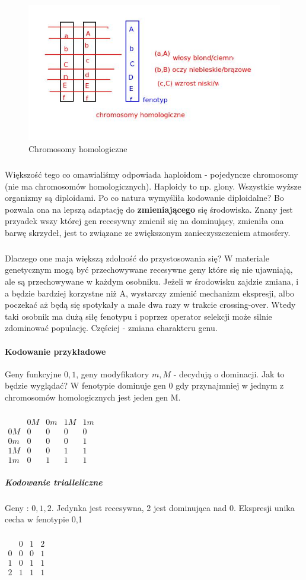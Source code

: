 \documentclass{article}
\begin{document}
		\begin{figure}[ht]
			\label{fig:fig2}
			\centering
			\includegraphics[scale=0.5]{homologiczne.jpeg}
			\caption{Chromosomy homologiczne}
		\end{figure}
		
		\subparagraph{} Większość tego co omawialiśmy odpowiada haploidom - pojedyncze chromosomy (nie ma chromosomów homologicznych). Haploidy to np. glony. Wszystkie wyższe organizmy są diploidami. Po co natura wymyśliła kodowanie diploidalne? Bo pozwala ona na lepszą adaptację do \textbf{zmieniającego} się środowiska. Znany jest przyadek wszy której gen recesywny zmienił się na dominujący, zmieniła ona barwę skrzydeł, jest to związane ze zwiększonym zanieczyszczeniem atmosfery. 
		\subparagraph{} Dlaczego one maja większą zdolność do przystosowania się? W materiale genetycznym mogą być przechowywane recesywne geny które się nie ujawniają, ale są przechowywane w każdym osobniku. Jeżeli w środowisku zajdzie zmiana, i a będzie bardziej korzystne niż A, wystarczy zmienić mechanizm ekspresji, albo poczekać aż będą się spotykały a małe dwa razy w trakcie crossing-over. Wtedy taki osobnik ma dużą siłę fenotypu i poprzez operator selekcji może silnie zdominować populację. Częściej - zmiana charakteru genu. 
		\paragraph{Kodowanie przykładowe}Geny funkcyjne ${0,1}$, geny modyfikatory ${m,M}$ - decydują o dominacji. Jak to będzie wyglądać? W fenotypie dominuje gen 0 gdy przynajmniej w jednym z chromosomów homologicznych jest jeden  gen M.
		\subparagraph{} $\begin{array}{|c|c|c|c|c|}
			& 0M & 0m & 1M & 1m \\ 
			0M & 0 & 0 & 0 & 0 \\ 
			0m & 0 & 0 & 0 & 1 \\ 
			1M & 0 & 0 & 1 & 1 \\ 
			1m & 0 & 1 & 1 & 1
		\end{array}$ 
		\subparagraph{Kodowanie trialleliczne} Geny : ${0,1,2}$. Jedynka jest recesywna, 2 jest dominująca nad 0. Ekspresji unika cecha w fenotypie {0,1} \subparagraph{}
		$\begin{array}{|c|c|c|c|}
			& 0 & 1 & 2 \\ 
			0 & 0 & 0 & 1 \\ 
			1 & 0 & 1 & 1 \\ 
			2 & 1 & 1 & 1
		\end{array} $
\end{document}
